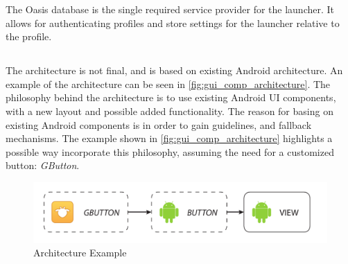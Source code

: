 The Oasis database is the single required service provider for the launcher.
It allows for authenticating profiles and store settings for the launcher relative to the profile.

\subsection{\guicomponents[]}
The \guicomponents[] architecture is not final, and is based on existing Android architecture. An example of the architecture can be seen in \autoref{fig:gui_comp_architecture}.
The philosophy behind the architecture is to use existing Android UI components, with a new layout and possible added functionality.
The reason for basing on existing Android components is in order to gain guidelines, and fallback mechanisms.
The example shown in \autoref{fig:gui_comp_architecture} highlights a possible way incorporate this philosophy, assuming the need for a customized button: \textit{GButton}. 
\begin{figure}[h]
	\centering
	\includegraphics[width=1\textwidth]{gfx/gui_components_architecture.pdf}
	\caption{\guicomponents[] Architecture Example}
	\label{fig:gui_comp_architecture}
\end{figure}

